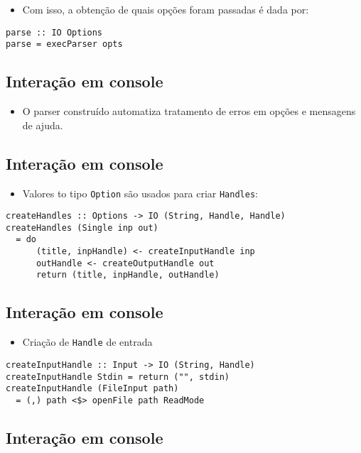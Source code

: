 \documentclass[11pt]{article}
\begin{document}
\begin{itemize}
\item Com isso, a obtenção de quais opções foram passadas é dada por:
\end{itemize}

\begin{verbatim}
parse :: IO Options
parse = execParser opts
\end{verbatim}
\subsection*{Interação em console}
\label{sec:org62f97c4}

\begin{itemize}
\item O parser construído automatiza tratamento de erros em opções e mensagens de ajuda.
\end{itemize}
\subsection*{Interação em console}
\label{sec:org6561e77}

\begin{itemize}
\item Valores to tipo \texttt{Option} são usados para criar \texttt{Handles}:
\end{itemize}

\begin{verbatim}
createHandles :: Options -> IO (String, Handle, Handle)
createHandles (Single inp out)
  = do
      (title, inpHandle) <- createInputHandle inp
      outHandle <- createOutputHandle out
      return (title, inpHandle, outHandle)
\end{verbatim}
\subsection*{Interação em console}
\label{sec:orgc5a89f7}

\begin{itemize}
\item Criação de \texttt{Handle} de entrada
\end{itemize}

\begin{verbatim}
createInputHandle :: Input -> IO (String, Handle)
createInputHandle Stdin = return ("", stdin)
createInputHandle (FileInput path)
  = (,) path <$> openFile path ReadMode
\end{verbatim}
\subsection*{Interação em console}
\label{sec:org02b93b2}
\end{document}
